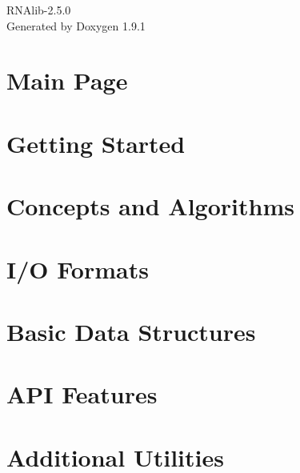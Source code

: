 \let\mypdfximage\pdfximage\def\pdfximage{\immediate\mypdfximage}\documentclass[twoside]{book}
\newcommand{\+}{\discretionary{\mbox{\scriptsize$\hookleftarrow$}}{}{}}
\newcommand{\clearemptydoublepage}{%
  \newpage{\pagestyle{empty}\cleardoublepage}%
}
\begin{document}
\raggedbottom

\hypersetup{pageanchor=false,
             bookmarksnumbered=true,
             pdfencoding=unicode
            }
\begin{titlepage}
\vspace*{7cm}
\begin{center}%
{\Large RNAlib-\/2.5.0 }\\
\vspace*{1cm}
{\large Generated by Doxygen 1.9.1}\\
\end{center}
\end{titlepage}
\clearemptydoublepage
{}
\tableofcontents
\clearemptydoublepage
{}
\hypersetup{pageanchor=true}

\chapter{Main Page}
\label{index}\hypertarget{index}{}
\chapter{Getting Started}
\label{getting_started}

\chapter{Concepts and Algorithms}
\label{concepts}

\chapter{I/O Formats}
\label{io}

\chapter{Basic Data Structures}
\label{data_structures}

\chapter{API Features}
\label{api_features}

\chapter{Additional Utilities}
\label{utilities}

\end{document}
